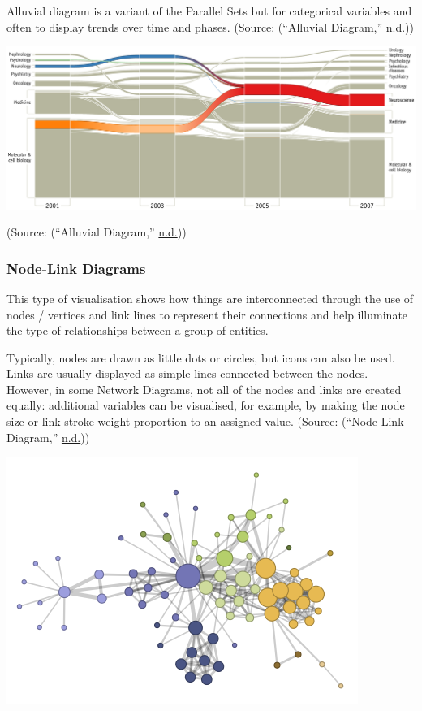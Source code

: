 \documentclass[]{book}
\begin{document}
Alluvial diagram is a variant of the Parallel Sets but for categorical variables and often to display trends over time and phases.
(Source: (``Alluvial Diagram,'' \protect\hyperlink{ref-alluvial}{n.d.}))

\includegraphics{images/alluvial-diag.png}

(Source: (``Alluvial Diagram,'' \protect\hyperlink{ref-alluvial-diag}{n.d.}))

\hypertarget{node-link-diagrams}{%
\subsubsection{Node-Link Diagrams}\label{node-link-diagrams}}

This type of visualisation shows how things are interconnected through the use of nodes / vertices and link lines to represent their connections and help illuminate the type of relationships between a group of entities.

Typically, nodes are drawn as little dots or circles, but icons can also be used. Links are usually displayed as simple lines connected between the nodes. However, in some Network Diagrams, not all of the nodes and links are created equally: additional variables can be visualised, for example, by making the node size or link stroke weight proportion to an assigned value.
(Source: (``Node-Link Diagram,'' \protect\hyperlink{ref-node-link}{n.d.}))

\includegraphics{images/node-link-diag.png}
\end{document}
